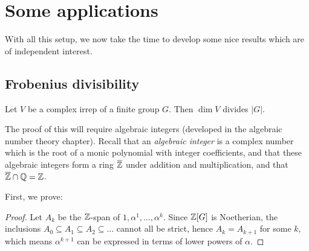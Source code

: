 \chapter{Some applications}
\label{ch:applications}
With all this setup, we now take the time to develop some nice
results which are of independent interest.

\section{Frobenius divisibility}
\begin{theorem}
	Let $V$ be a complex irrep of a finite group $G$.
	Then $\dim V$ divides $|G|$.
\end{theorem}
The proof of this will require algebraic integers
(developed in the algebraic number theory chapter).
Recall that an \emph{algebraic integer} is a complex number
which is the root of a monic polynomial with integer coefficients,
and that these algebraic integers form a ring $\overline{\mathbb Z}$
under addition and multiplication, and that $\overline{\mathbb Z} \cap \mathbb Q = \mathbb Z$.

First, we prove:
\newcommand{\tempuuujbhtkx}{$\ZZ[G]$}
\begin{proof}
	Let $A_k$ be the $\mathbb Z$-span of $1, \alpha^1, \dots, \alpha^k$.
	Since $\mathbb Z[G]$ is Noetherian,
	the inclusions $A_0 \subseteq A_1 \subseteq A_2 \subseteq \dots$
	cannot all be strict, hence $A_k = A_{k+1}$ for some $k$,
	which means $\alpha^{k+1}$ can be expressed in terms of
	lower powers of $\alpha$.
\end{proof}


